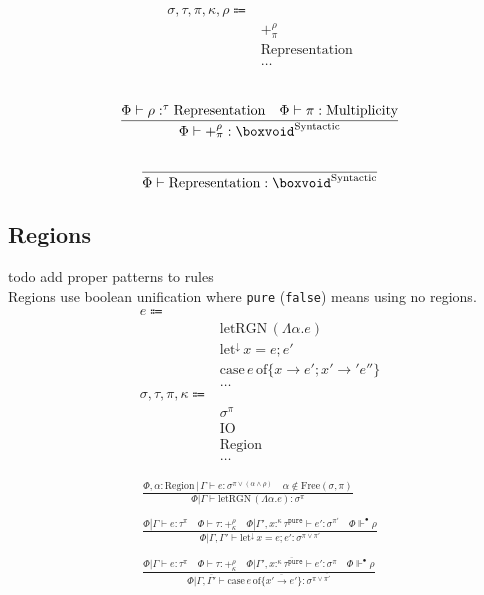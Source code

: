 \documentclass {article}
\begin{document}
\begin{align*}
\sigma, \tau, \pi, \kappa, \rho \Coloneqq & \\
& +^\rho_\pi \tag{Type}\\
& \text{Representation} \tag {Representation}\\
& \dots
\end{align*}

\begin{gather*}
\\
\frac
{\Phi \vdash \rho :^\tau \text{Representation} \quad \Phi \vdash \pi : \text{Multiplicity}}
{\Phi \vdash +^\rho_\pi : \boxvoid^\text{Syntactic}} \\
\\
\frac
{}
{\Phi \vdash \text{Representation} : \boxvoid^\text{Syntactic}}
\end{gather*}

\subsection{Regions}
todo add proper patterns to rules \\
Regions use boolean unification where \texttt{pure} (\texttt{false}) means using no regions.
\begin{align*}
e \Coloneqq & \\
& \text{letRGN} \, (\Lambda \alpha. e) \tag{Bind Region Type Variable (Unused)} \\
& \text{let}^\downarrow \, x = e; e' \tag{Runtime Let} \\
& \text{case} \, e \, \text{of} \{ x \to e'; x' \to' e''\} \tag{Case} \\
& \dots \\
\sigma, \tau, \pi, \kappa \Coloneqq & \\
& \sigma^\pi \tag{Region Effect} \\
& \text{IO} \tag{IO Region} \\
& \text{Region} \tag{Region} \\
& \dots
\end{align*}

\begin{gather*}
\frac
{\Phi , \alpha : \text{Region} \, | \, \Gamma \vdash e : \sigma^{\pi \lor (\alpha \land \rho)} \quad \alpha \notin \text{Free}(\sigma, \pi)}
{\Phi | \Gamma \vdash \text{letRGN} \, (\Lambda \alpha. e) : \sigma^\pi} \\
\\
\frac
{\Phi | \Gamma \vdash e : \tau^\pi \quad \Phi \vdash \tau : +^{\rho}_{\kappa} \quad
\Phi | \Gamma', x :^{\kappa} \tau^\texttt{pure} \vdash e' : \sigma^{\pi'} \quad
\Phi \Vdash^\bullet \rho}
{\Phi | \Gamma, \Gamma' \vdash \text{let}^\downarrow \, x = e; e' : \sigma^{\pi \lor \pi'}} \\
\\
\frac
{\Phi | \Gamma \vdash e : \tau^\pi \quad \Phi \vdash \tau : +^{\rho}_{\kappa} \quad
\overline{ \Phi | \Gamma', x :^{\kappa} \tau^\texttt{pure} \vdash e' : \sigma^\pi } \quad
\Phi \Vdash^\bullet \rho}
{\Phi | \Gamma, \overline {\Gamma'} \vdash \text{case} \, e \, \text{of} \{ \overline {x' \to  e' } \} : \sigma^{\pi \lor \overline{\pi'}}} \\
\end{gather*}
\end{document}
